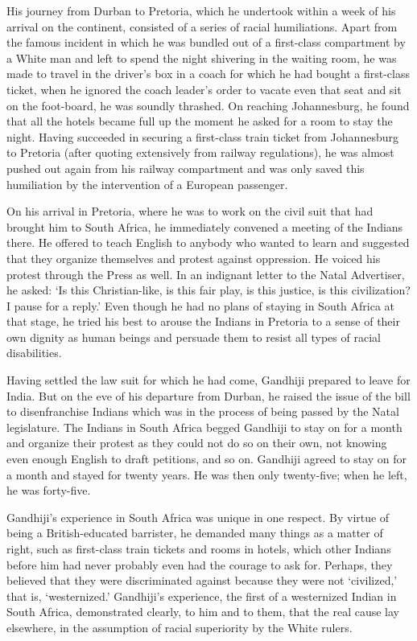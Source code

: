 \begin{multicols}{2}
His journey from Durban to Pretoria, which he undertook within a week of his arrival on the continent, consisted of a series of racial humiliations. Apart from the famous incident in which he was bundled out of a first-class compartment by a White man and left to spend the night shivering in the waiting room, he was made to travel in the driver's box in a coach for which he had bought a first-class ticket, when he ignored the coach leader's order to vacate even that seat and sit on the foot-board, he was soundly thrashed. On reaching Johannesburg, he found that all the hotels became full up the moment he asked for a room to stay the night. Having succeeded in securing a first-class train ticket from Johannesburg to Pretoria (after quoting extensively from railway regulations), he was almost pushed out again from his railway compartment and was only saved this humiliation by the intervention of a European passenger.

On his arrival in Pretoria, where he was to work on the civil suit that had brought him to South Africa, he immediately convened a meeting of the Indians there. He offered to teach English to anybody who wanted to learn and suggested that they organize themselves and protest against oppression. He voiced his protest through the Press as well. In an indignant letter to the Natal Advertiser, he asked: `Is this Christian-like, is this fair play, is this justice, is this civilization? I pause for a reply.' Even though he had no plans of staying in South Africa at that stage, he tried his best to arouse the Indians in Pretoria to a sense of their own dignity as human beings and persuade them to resist all types of racial disabilities.

Having settled the law suit for which he had come, Gandhiji prepared to leave for India. But on the eve of his departure from Durban, he raised the issue of the bill to disenfranchise Indians which was in the process of being passed by the Natal legislature. The Indians in South Africa begged Gandhiji to stay on for a month and organize their protest as they could not do so on their own, not knowing even enough English to draft petitions, and so on. Gandhiji agreed to stay on for a month and stayed for twenty years. He was then only twenty-five; when he left, he was forty-five.

Gandhiji's experience in South Africa was unique in one respect. By virtue of being a British-educated barrister, he demanded many things as a matter of right, such as first-class train tickets and rooms in hotels, which other Indians before him had never probably even had the courage to ask for. Perhaps, they believed that they were discriminated against because they were not `civilized,' that is, `westernized.' Gandhiji's experience, the first of a westernized Indian in South Africa, demonstrated clearly, to him and to them, that the real cause lay elsewhere, in the assumption of racial superiority by the White rulers.


\end{multicols}
